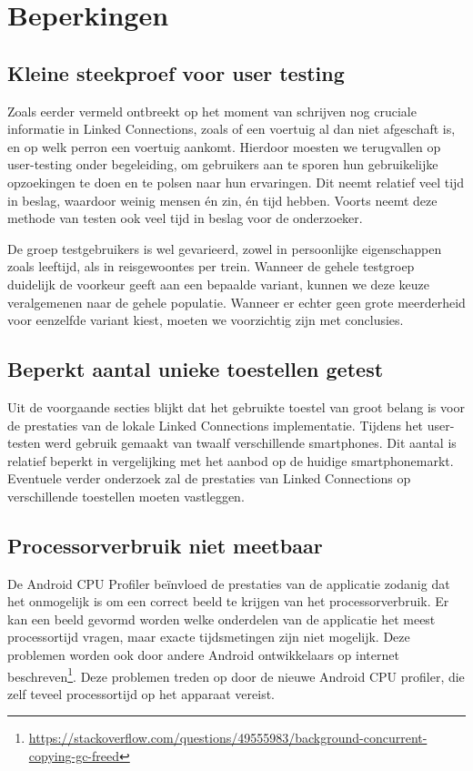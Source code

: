 \section{Beperkingen}
\subsection{Kleine steekproef voor user testing}
Zoals eerder vermeld ontbreekt op het moment van schrijven nog cruciale informatie in Linked Connections, zoals of een voertuig al dan niet afgeschaft is, en op welk perron een voertuig aankomt. Hierdoor moesten we terugvallen op user-testing onder begeleiding, om gebruikers aan te sporen hun gebruikelijke opzoekingen te doen en te polsen naar hun ervaringen. Dit neemt relatief veel tijd in beslag, waardoor weinig mensen én zin, én tijd hebben. Voorts neemt deze methode van testen ook veel tijd in beslag voor de onderzoeker. 

De groep testgebruikers is wel gevarieerd, zowel in persoonlijke eigenschappen zoals leeftijd, als in reisgewoontes per trein. Wanneer de gehele testgroep duidelijk de voorkeur geeft aan een bepaalde variant, kunnen we deze keuze veralgemenen naar de gehele populatie. Wanneer er echter geen grote meerderheid voor eenzelfde variant kiest, moeten we voorzichtig zijn met conclusies.

\subsection{Beperkt aantal unieke toestellen getest}
Uit de voorgaande secties blijkt dat het gebruikte toestel van groot belang is voor de prestaties van de lokale Linked Connections implementatie. Tijdens het user-testen werd gebruik gemaakt van twaalf verschillende smartphones. Dit aantal is relatief beperkt in vergelijking met het aanbod op de huidige smartphonemarkt. Eventuele verder onderzoek zal de prestaties van Linked Connections op verschillende toestellen moeten vastleggen.

\subsection{Processorverbruik niet meetbaar}
De Android CPU Profiler beïnvloed de prestaties van de applicatie zodanig dat het onmogelijk is om een correct beeld te krijgen van het processorverbruik. Er kan een beeld gevormd worden welke onderdelen van de applicatie het meest processortijd vragen, maar exacte tijdsmetingen zijn niet mogelijk. Deze problemen worden ook door andere Android ontwikkelaars op internet beschreven\footnote{\url{https://stackoverflow.com/questions/49555983/background-concurrent-copying-gc-freed}}. Deze problemen treden op door de nieuwe Android CPU profiler, die zelf teveel processortijd op het apparaat vereist.

